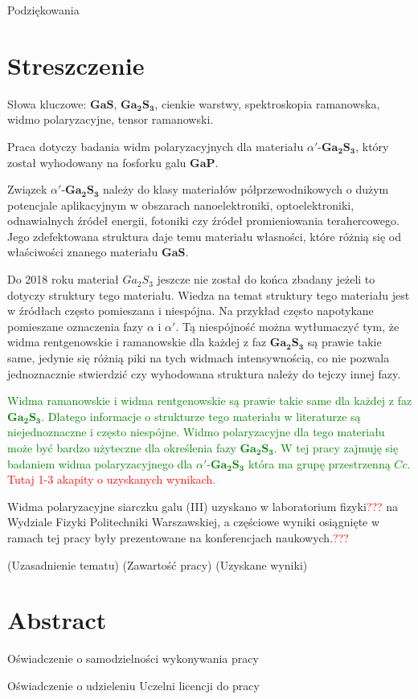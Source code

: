 Podziękowania

\newpage

\section*{Streszczenie}

Słowa kluczowe: $\mathbf{GaS}$, $\mathbf{Ga_{2}S_{3}}$, cienkie warstwy, spektroskopia ramanowska, widmo polaryzacyjne, tensor ramanowski.

Praca dotyczy badania widm polaryzacyjnych dla materiału $\alpha'$-$\mathbf{Ga_{2}S_{3}}$, który został wyhodowany na fosforku galu $\mathbf{GaP}$. 

Związek $\alpha'$-$\mathbf{Ga_{2}S_{3}}$ należy do klasy materiałów półprzewodnikowych o dużym potencjale aplikacyjnym w obszarach nanoelektroniki, optoelektroniki, odnawialnych źródeł energii, fotoniki czy źródeł promieniowania terahercowego. Jego zdefektowana struktura daje temu materiału własności, które różnią się od właściwości znanego materiału $\mathbf{GaS}$.

Do 2018 roku materiał $Ga_{2}S_{3}$ jeszcze nie został do końca zbadany jeżeli to dotyczy struktury tego materiału. Wiedza na temat struktury tego materiału jest w źródłach często pomieszana i niespójna. Na przykład często napotykane pomieszane oznaczenia fazy $\alpha$ i $\alpha'$. Tą niespójność można wytłumaczyć tym, że widma rentgenowskie i ramanowskie dla każdej z faz $\mathbf{Ga_{2}S_{3}}$ są prawie takie same, jedynie się różnią piki na tych widmach intensywnością, co nie pozwala jednoznacznie stwierdzić czy wyhodowana struktura należy do tejczy innej fazy.

\textcolor{green}{Widma ramanowskie i widma rentgenowskie są prawie takie same dla każdej z faz $\mathbf{Ga_{2}S_{3}}$. Dlatego informacje o strukturze tego materiału w literaturze są niejednoznaczne i często niespójne. Widmo polaryzacyjne dla tego materiału może być bardzo użyteczne dla określenia fazy $\mathbf{Ga_{2}S_{3}}$. W tej pracy zajmuję się badaniem widma polaryzacyjnego dla $\alpha'$-$\mathbf{Ga_{2}S_{3}}$ która ma grupę przestrzenną $Cc$.}
\textcolor{red}{Tutaj 1-3 akapity o uzyskanych wynikach.}

Widma polaryzacyjne siarczku galu (III) uzyskano w laboratorium fizyki\textcolor{red}{???} na Wydziale Fizyki Politechniki Warszawskiej, a częściowe wyniki osiągnięte w ramach tej pracy były prezentowane na konferencjach naukowych.\textcolor{red}{???} 

(Uzasadnienie tematu) (Zawartość pracy) (Uzyskane wyniki)

\newpage

\section*{Abstract}

\newpage

Oświadczenie o samodzielności wykonywania pracy

\newpage

Oświadczenie o udzieleniu Uczelni licencji do pracy

\newpage